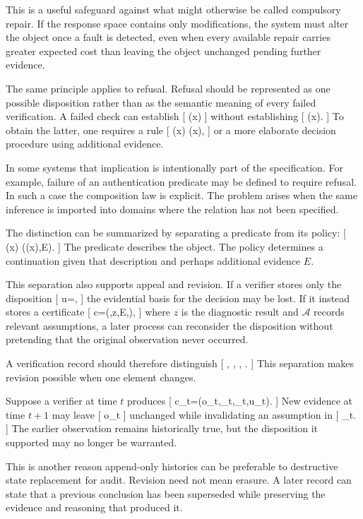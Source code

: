 \documentclass[11pt]{article}
\begin{document}
This is a useful safeguard against what might otherwise be called compulsory repair. If the response space contains only modifications, the system must alter the object once a fault is detected, even when every available repair carries greater expected cost than leaving the object unchanged pending further evidence.

The same principle applies to refusal. Refusal should be represented as one possible disposition rather than as the semantic meaning of every failed verification. A failed check can establish
[
\neg\Phi(x)
]
without establishing
[
(x).
]
To obtain the latter, one requires a rule
[
\neg\Phi(x)
\Longrightarrow
{}(x),
]
or a more elaborate decision procedure using additional evidence.

In some systems that implication is intentionally part of the specification. For example, failure of an authentication predicate may be defined to require refusal. In such a case the composition law is explicit. The problem arises when the same inference is imported into domains where the relation has not been specified.

The distinction can be summarized by separating a predicate from its policy:
[
\Phi(x)
\qquad{}\qquad
\kappa(\Phi(x),E).
]
The predicate describes the object. The policy determines a continuation given that description and perhaps additional evidence $E$.

This separation also supports appeal and revision. If a verifier stores only the disposition
[
u=,
]
the evidential basis for the decision may be lost. If it instead stores a certificate
[
c=(\Phi,z,E,),
]
where $z$ is the diagnostic result and $\mathcal{A}$ records relevant assumptions, a later process can reconsider the disposition without pretending that the original observation never occurred.

A verification record should therefore distinguish
[
,
\quad
{},
\quad
{},
\quad
{}.
]
This separation makes revision possible when one element changes.

Suppose a verifier at time $t$ produces
[
c_t=(o_t,\phi_t,_t,u_t).
]
New evidence at time $t+1$ may leave
[
o_t
]
unchanged while invalidating an assumption in
[
_t.
]
The earlier observation remains historically true, but the disposition it supported may no longer be warranted.

This is another reason append-only histories can be preferable to destructive state replacement for audit. Revision need not mean erasure. A later record can state that a previous conclusion has been superseded while preserving the evidence and reasoning that produced it.
\end{document}
